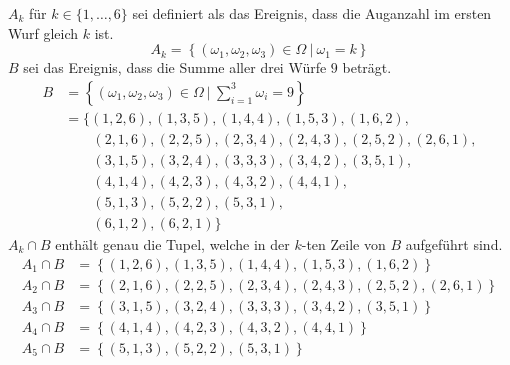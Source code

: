 \documentclass[a4paper]{scrartcl}
\begin{document}
\begin{enumerate}[label=\bfseries\arabic*.]
        $A_k$ für $k \in \{1, \ldots, 6\}$ sei definiert als das Ereignis, dass
        die Auganzahl im ersten Wurf gleich $k$ ist.
        \begin{equation*}
            A_k = \left\{ (\omega_1, \omega_2, \omega_3) \in \Omega \ \vert \ 
            \omega_1 = k \right\}
        \end{equation*}
        $B$ sei das Ereignis, dass die Summe aller drei Würfe $9$ beträgt.
        \begin{equation*}
            \begin{split}
                B &= \left\{ (\omega_1, \omega_2, \omega_3) \in \Omega \ \vert\ 
                    \sum_{i=1}^3 \omega_i = 9 \right\} \\
                    &= \Big\{ 
                            (1, 2, 6), (1, 3, 5), (1, 4, 4), (1, 5, 3),
                            (1, 6, 2), \\
                    &\qquad (2, 1, 6), (2, 2, 5), (2, 3, 4), (2, 4, 3),
                            (2, 5, 2), (2, 6, 1), \\
                    &\qquad (3, 1, 5), (3, 2, 4), (3, 3, 3), (3, 4, 2),
                            (3, 5, 1), \\
                    &\qquad (4, 1, 4), (4, 2, 3), (4, 3, 2), (4, 4, 1), \\
                    &\qquad (5, 1, 3), (5, 2, 2), (5, 3, 1), \\
                    &\qquad (6, 1, 2), (6, 2, 1)
                    \Big\}
            \end{split}
        \end{equation*}
        $A_k \cap B$ enthält genau die Tupel, welche in der $k$-ten Zeile von
        $B$ aufgeführt sind.
        \begin{align*}
            A_1 \cap B &= \left\{ (1, 2, 6), (1, 3, 5), (1, 4, 4), (1, 5, 3),
                                  (1, 6, 2) \right\} \\
            A_2 \cap B &= \left\{ (2, 1, 6), (2, 2, 5), (2, 3, 4), (2, 4, 3),
                                  (2, 5, 2), (2, 6, 1) \right\} \\
            A_3 \cap B &= \left\{ (3, 1, 5), (3, 2, 4), (3, 3, 3), (3, 4, 2),
                                  (3, 5, 1) \right\} \\
            A_4 \cap B &= \left\{ (4, 1, 4), (4, 2, 3), (4, 3, 2), (4, 4, 1)
                          \right\} \\
            A_5 \cap B &= \left\{ (5, 1, 3), (5, 2, 2), (5, 3, 1) \right\} \\

\end{align*}
\end{enumerate}
\end{document}

